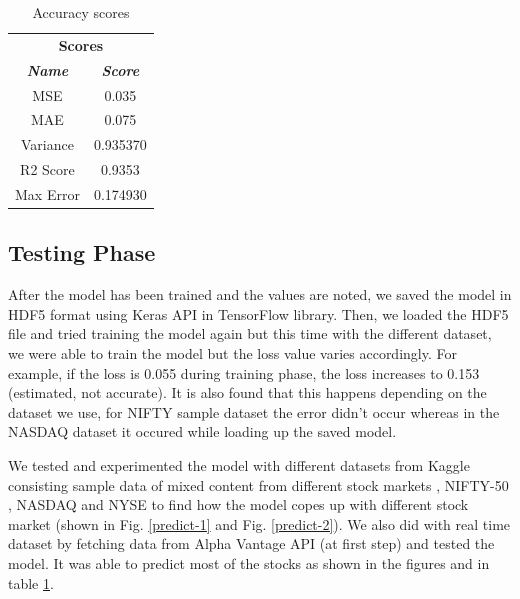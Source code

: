 \documentclass[conference]{IEEEtran}
\begin{document}
\begin{table}[htbp]
	\caption{Accuracy scores}
	\begin{center}
		\begin{tabular}{|c|c|}
			\hline
			\multicolumn{2}{|c|}{\textbf{Scores}} \\
			\cline{1-2} 
			\textbf{\textit{Name}}& \textbf{\textit{Score}} \\
			\hline
			MSE & 0.035 \\
			\hline
			MAE & 0.075 \\
			\hline
			Variance & 0.935370\\
			\hline
			R2 Score & 0.9353 \\
			\hline
			Max Error & 0.174930 \\
			\hline
		\end{tabular}
		\label{tab-mse}
	\end{center}
\end{table}


\subsection{Testing Phase}
After the model has been trained and the values are noted, we saved the model in HDF5 format using Keras API in TensorFlow library. Then, we loaded the HDF5 file and tried training the model again but this time with the different dataset, we were able to train the model but the loss value varies accordingly. For example, if the loss is 0.055 during training phase, the loss increases to 0.153 (estimated, not accurate). It is also found that this happens depending on the dataset we use, for NIFTY sample dataset the error didn't occur whereas in the NASDAQ dataset it occured while loading up the saved model.

We tested and experimented the model with different datasets from Kaggle consisting sample data of mixed content from different stock markets \cite{b10}, NIFTY-50 \cite{b11}, NASDAQ and NYSE \cite{b12} to find how the model copes up with different stock market (shown in Fig. \ref{predict-1} and Fig. \ref{predict-2}). We also did with real time dataset by fetching data from Alpha Vantage API (at first step) and tested the model. It was able to predict most of the stocks as shown in the figures and in table \ref{tab-mse}.
\end{document}
